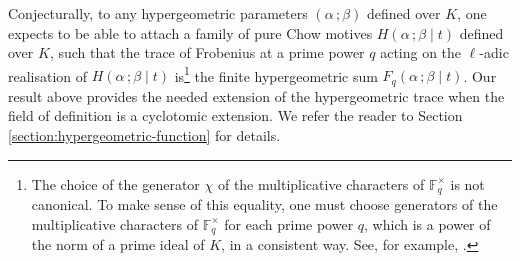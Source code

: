 \documentclass[11pt, reqno]{amsart}
\theoremstyle{plain}
\theoremstyle{definition}
\newcommand{\F}{\mathbb{F}}
\newcommand{\be}{\beta}
\newcommand{\al}{\alpha}
\begin{document}
Conjecturally, to any hypergeometric parameters $(\al \, ; \be)$ defined over $K$, one expects to be able to attach a family of pure Chow motives  $H(\al \, ; \be \mid t)$ defined over $K$, such that the trace of Frobenius at a prime power $q$ acting on the $\ell$-adic realisation of $H(\al \, ; \be \mid t)$ is\footnote{The choice of the generator $\chi$ of the multiplicative characters of $\F_q^\times$ is not canonical. To make sense of this equality, one must choose generators of the multiplicative characters of $\F_q^\times$ for each prime power $q$, which is a power of the norm of a prime ideal of $K$,  in a consistent way. See, for example, \cite[Section 5]{katz-another-look}.} the finite hypergeometric sum $F_q(\al \, ; \be \mid t)$.
Our result above provides the needed extension of the hypergeometric trace when the field of definition is a cyclotomic extension. We refer the reader to Section \ref{section:hypergeometric-function} for details. 
\end{document}

